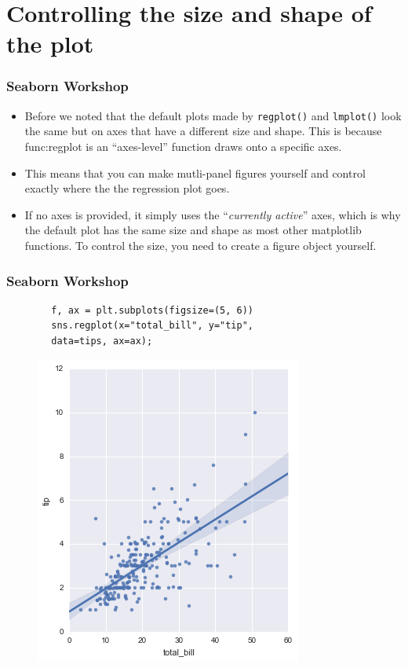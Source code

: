 \documentclass{beamer}
\begin{document}
\section{Controlling the size and shape of the plot}
\begin{frame}[fragile]
	\frametitle{Seaborn Workshop}
	\large
	\begin{itemize}
		\item Before we noted that the default plots made by \texttt{regplot()} and \texttt{lmplot()} look the same but on axes that have a different size and shape. This is because func:regplot is an “axes-level” function draws onto a specific axes.
		\item  This means that you can make mutli-panel figures yourself and control exactly where the the regression plot goes. 
		\item If no axes is provided, it simply uses the “\textit{currently active}” axes, which is why the default plot has the same size and shape as most other matplotlib functions. To control the size, you need to create a figure object yourself.
	\end{itemize}
	
\end{frame}
\begin{frame}[fragile]
	\frametitle{Seaborn Workshop}
	\large
	\begin{framed}
		\begin{verbatim}
		f, ax = plt.subplots(figsize=(5, 6))
		sns.regplot(x="total_bill", y="tip", 
		data=tips, ax=ax);
		\end{verbatim}
	\end{framed}
	\begin{figure}
		\centering
		\includegraphics[width=0.55\linewidth]{images/regression_46_0}
	\end{figure}
\end{frame}
\end{document}
